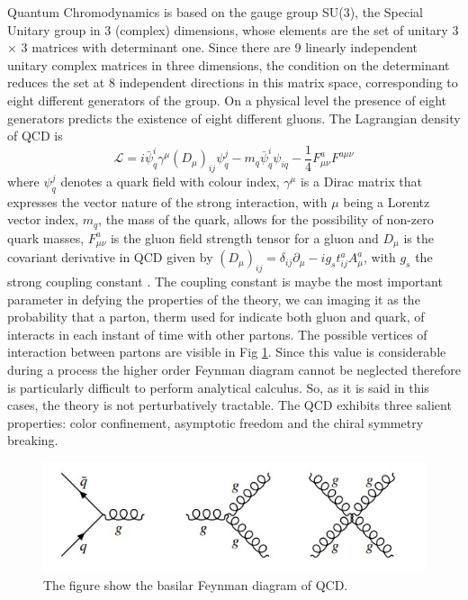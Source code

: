 \documentclass[12pt,a4paper]{book}
\begin{document}
	Quantum Chromodynamics is based on the gauge group SU(3), the Special Unitary group in 3 (complex) dimensions, whose elements are the set of unitary 3 × 3 matrices with determinant one. Since there are 9 linearly independent unitary complex matrices in three dimensions, the condition on the determinant reduces the set at 8 independent directions in this matrix space, corresponding to eight different generators of the group. On a physical level the presence of eight generators predicts the existence of eight different gluons.  The Lagrangian density of QCD is
	\begin{equation}
		\boxed{\mathcal{L}= i \bar{\psi}^i_q \gamma^\mu(D_\mu)_{ij}\psi^j_q- m_q \bar{\psi}^i_q \psi_{iq}-\frac{1}{4} F^a_{\mu \nu} F^{a\mu \nu}}
		\label{eq:QCD_lagrangian}
	\end{equation} 
	where $\psi^j_q$ denotes a quark field with colour index, $\gamma^\mu$ is a Dirac matrix that expresses the vector nature of the strong interaction, with $\mu$ being a Lorentz vector index, $m_q$, the mass of the quark, allows for the possibility of non-zero quark masses, $F^a_{\mu \nu}$ is the gluon field strength tensor for a gluon and $D_\mu$ is the covariant derivative in QCD given by $(D_\mu)_{ij}= \delta_{ij} \partial_\mu - ig_s t^a_{ij} A^a_\mu$, with $g_s$ the strong coupling constant \cite{Skands_2013}.
	The coupling constant is maybe the most important parameter in defying the properties of the theory, we can imaging it as the probability that a parton, therm used for indicate both gluon and quark, of interacts in each instant of time with other partons. The possible vertices of interaction between partons are visible in Fig \ref{fig:QCD_vertices}. Since this value is considerable during a process the higher order Feynman diagram cannot be neglected therefore is particularly difficult to perform analytical calculus. So, as it is said in this cases, the theory is not perturbatively tractable.  
	The QCD exhibits three salient properties: color confinement, asymptotic freedom and the chiral symmetry breaking. 
	
	\begin{figure}		
		\centering
		\includegraphics[width=0.7\linewidth]{pictures/QCD_vertices.jpeg}
		\caption{The figure show the basilar Feynman diagram of QCD.}
		\label{fig:QCD_vertices} 
	\end{figure}
	
\end{document}
